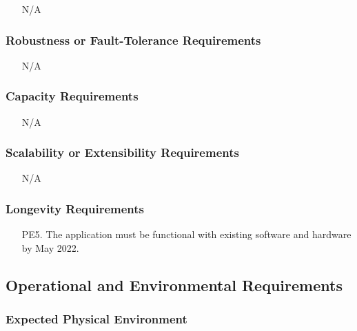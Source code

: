 \documentclass[12pt, titlepage]{article}
\begin{document}
\begin{itemize}
  \item[] N/A
\end{itemize}

\subsubsection{ Robustness or Fault-Tolerance Requirements}

\begin{itemize}
  \item[] N/A
\end{itemize}

\subsubsection{ Capacity Requirements}

\begin{itemize}
  \item[] N/A
\end{itemize}

\subsubsection{ Scalability or Extensibility Requirements}

\begin{itemize}
  \item[] N/A
\end{itemize}

\subsubsection{ Longevity Requirements}

\begin{itemize}
  \item[PE5.] The application must be functional with existing software and hardware by May 2022. 
\end{itemize}

\subsection{Operational and Environmental Requirements}

\subsubsection{ Expected Physical Environment}
\end{document}

